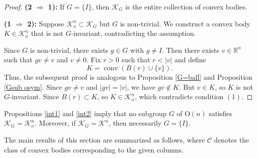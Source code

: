 \documentclass[12pt, reqno]{amsart}
\theoremstyle{definition}
\theoremstyle{remark}
\numberwithin{equation}{section}
\newcommand{\R}{\mathbb{R}}
\newcommand{\conv}{\operatorname{conv}}
\newcommand{\On}{\mathrm{O}(n)}
\newcommand{\KG}{\mathcal{K}_{G}}
\begin{document}
	\begin{proof}
			\noindent\textbf{(2 $\Rightarrow$ 1):}
		If	$G = \{I\}$, then $\KG$ is the entire collection of convex bodies. 
		 
		\noindent\textbf{(1 $\Rightarrow$ 2):}
Suppose	$\mathcal{K}^{n}_{o} \subset \KG$ but $G$ is non-trivial. We  construct a convex body $K \in \mathcal{K}^{n}_{o} $ that is not $G$-invariant, contradicting the assumption.
		
		Since $G$ is non-trivial, there exists $g \in G$ with $g \neq I$. Then there exists $v \in \R^n$ such that $gv \neq v$ and $v \neq 0$. Fix $r > 0$ such that $r < |v|$ and define
		\[
		K = \conv\left( B(r) \cup \{v\} \right).
		\]
		Thus, the subsequent proof is  analogous to Proposition \ref{G=ball} and Proposition \ref{Gsub osym}.
		Since $gv\neq v$ and $|gv|=|v|$,
		we have $gv \notin K$. But $v\in K$, so $K$ is not $G$-invariant.
		Since $B(r)\subset K$, so $K\in\mathcal{K}^{n}_{o}$,  which contradicts condition $
		(1)$.
	\end{proof}
	
	
	
Propositions \ref{int1} and \ref{int2} imply that no subgroup $G$ of $\On$ 
satisfies $\mathcal{K}_G = \mathcal{K}_o^n$.  Moreover, if $\KG = \mathcal{K}^{n}$, then necessarily $G = \{I\}$.
	
	
	The main results of this section are summarized as follows, 	where $\mathcal{C}$ denotes  the class of convex bodies corresponding to the given columns.
	
	
	
\end{document}
